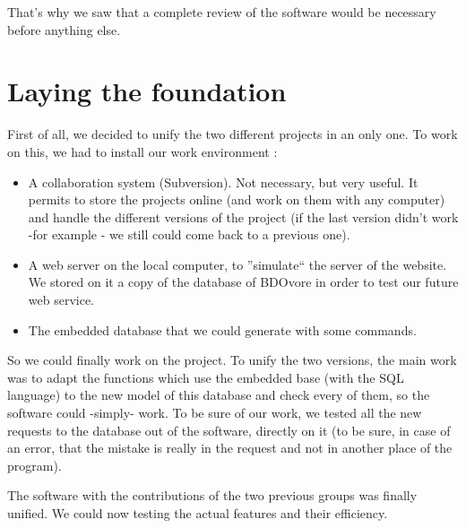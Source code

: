 \documentclass[11pt]{report} %
\begin{document}
That's why we saw that a complete review of the software would be necessary before anything else.

\section{Laying the foundation}
First of all, we decided to unify the two different projects in an only one. To work on this, we had to install our work environment :

\begin{itemize}
\item A collaboration system (Subversion). Not necessary, but very useful. It permits to store the projects online (and work on them with any computer) and handle the different versions of the project (if the last version didn't work -for example - we still could come back to a previous one).
\item A web server on the local computer, to ''simulate`` the server of the website. We stored on it a copy of the database of BDOvore in order to test our future web service.
\item The embedded database that we could generate with some commands.
\end{itemize}

So we could finally work on the project. To unify the two versions, the main work was to adapt the functions which use the embedded base (with the SQL language) to the new model of this database and check every of them, so the software could -simply- work. To be sure of our work, we tested all the new requests to the database out of the software, directly on it (to be sure, in case of an error, that the mistake is really in the request and not in another place of the program).

The software with the contributions of the two previous groups was finally unified. We could now testing the actual features and their efficiency.
\end{document}
